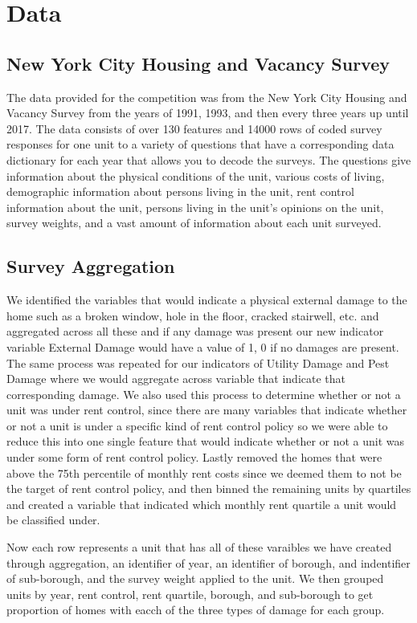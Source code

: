 \documentclass[11pt]{asaproc}\usepackage[]{graphicx}\usepackage[]{color}
\begin{document}
\section{Data\label{data}}
\subsection{New York City Housing and Vacancy Survey}
The data provided for the competition was from the New York City Housing and Vacancy Survey from the years of 1991, 1993, and then every three years up until 2017. The data consists of over 130 features and 14000 rows of coded survey responses for one unit to a variety of questions that have a corresponding data dictionary for each year that allows you to decode the surveys. The questions give information about the physical conditions of the unit, various costs of living, demographic information about persons living in the unit, rent control information about the unit, persons living in the unit’s opinions on the unit, survey weights, and a vast amount of information about each unit surveyed. 
\subsection{Survey Aggregation}
We identified the variables that would indicate a physical external damage to the home such as a broken window, hole in the floor, cracked stairwell, etc. and aggregated across all these and if any damage was present our new indicator variable External Damage would have a value of 1, 0 if no damages are present. The same process was repeated for our indicators of Utility Damage and Pest Damage where we would aggregate across variable that indicate that corresponding damage. We also used this process to determine whether or not a unit was under rent control, since there are many variables that indicate whether or not a unit is under a specific kind of rent control policy so we were able to reduce this into one single feature that would indicate whether or not a unit was under some form of rent control policy. Lastly removed the homes that were above the 75th percentile of monthly rent costs since we deemed them to not be the target of rent control policy, and then binned the remaining units by quartiles and created a variable that indicated which monthly rent quartile a unit would be classified under.

Now each row represents a unit that has all of these varaibles we have created through aggregation, an identifier of year, an identifier of borough, and indentifier of sub-borough, and the survey weight applied to the unit. We then grouped units by year, rent control, rent quartile, borough, and sub-borough to get proportion of homes with eacch of the three types of damage for each group.
\end{document}
